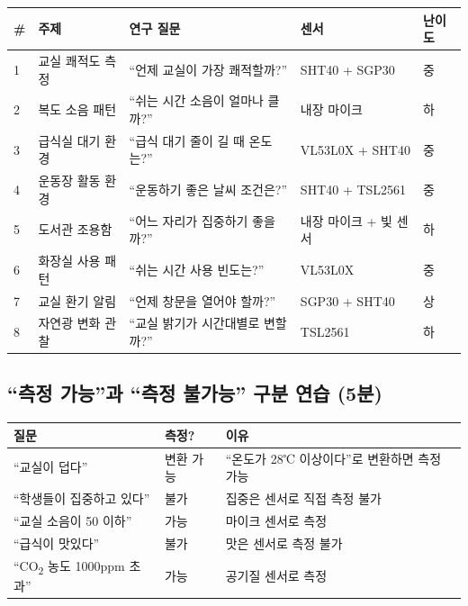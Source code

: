 \documentclass[11pt, a4paper]{article}
\newcommand{\COtwo}{CO\textsubscript{2}}
\begin{document}
\begin{center}
\small
\begin{tabularx}{\textwidth}{C{0.4cm}L{2.8cm}L{4.2cm}L{3.5cm}C{0.8cm}}
\toprule
\textbf{\#} & \textbf{주제} & \textbf{연구 질문} & \textbf{센서} & \textbf{난이도} \\
 & 교실 쾌적도 측정 & ``언제 교실이 가장 쾌적할까?'' & SHT40 + SGP30 & 중 \\
2 & 복도 소음 패턴 & ``쉬는 시간 소음이 얼마나 클까?'' & 내장 마이크 & 하 \\
3 & 급식실 대기 환경 & ``급식 대기 줄이 길 때 온도는?'' & VL53L0X + SHT40 & 중 \\
4 & 운동장 활동 환경 & ``운동하기 좋은 날씨 조건은?'' & SHT40 + TSL2561 & 중 \\
5 & 도서관 조용함 & ``어느 자리가 집중하기 좋을까?'' & 내장 마이크 + 빛 센서 & 하 \\
6 & 화장실 사용 패턴 & ``쉬는 시간 사용 빈도는?'' & VL53L0X & 중 \\
7 & 교실 환기 알림 & ``언제 창문을 열어야 할까?'' & SGP30 + SHT40 & 상 \\
8 & 자연광 변화 관찰 & ``교실 밝기가 시간대별로 변할까?'' & TSL2561 & 하 \\
\bottomrule
\end{tabularx}
\end{center}

\subsection{``측정 가능''과 ``측정 불가능'' 구분 연습 (5분)}

\begin{center}
\begin{tabularx}{0.95\textwidth}{L{4cm}C{1.5cm}X}
\toprule
\textbf{질문} & \textbf{측정?} & \textbf{이유} \\
\midrule
``교실이 덥다'' & 변환 가능 & ``온도가 28℃ 이상이다''로 변환하면 측정 가능 \\
``학생들이 집중하고 있다'' & 불가 & 집중은 센서로 직접 측정 불가 \\
``교실 소음이 50 이하'' & 가능 & 마이크 센서로 측정 \\
``급식이 맛있다'' & 불가 & 맛은 센서로 측정 불가 \\
``\COtwo{} 농도 1000ppm 초과'' & 가능 & 공기질 센서로 측정 \\
\bottomrule
\end{tabularx}
\end{center}
\end{document}
